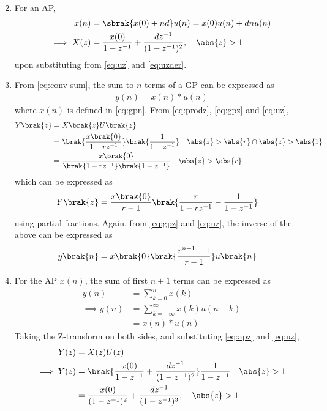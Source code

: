 \begin{enumerate}[label=\thesubsection.\arabic*,ref=\thesubsection.\theenumi]
\begin{align}
	       \label{eq:uzder}
\end{align}
\item For an AP, 
\begin{align}
	x(n) &= \sbrak{x(0) + nd} u(n) = x(0)u(n) + dnu(n)  \\
	\implies X(z) &= \frac{x(0)}{1-z^{-1}} + \frac{dz^{-1}}{(1-z^{-1})^{2}}, \quad \abs{z} > 1 
	       \label{eq:apz}
\end{align}
upon substituting from 
	       \eqref{eq:uz}
	       and
	       \eqref{eq:uzder}.
\item From 
	\eqref{eq:conv-sum},  the sum to $n$ terms  of a GP can be expressed as
\begin{align}
	y(n) = x(n)*u(n) 
\end{align}
		where $x(n)$ is defined in 
	       \eqref{eq:gpn}.
From \eqref{eq:prodz}, \eqref{eq:gpz} and \eqref{eq:uz},
\begin{align}
	Y\brak{z}&= X\brak{z} U\brak{z}
	\\
	&=\brak{\frac{x\brak{0}}{1-rz^{-1}}}\brak{\frac{1}{1-z^{-1}}} \quad \abs{z} > \abs{r} \cap \abs{z}>\abs{1}
	\\
	&=\frac{x\brak{0}}{\brak{1-rz^{-1}}\brak{1-z^{-1}}} \quad \abs{z} > \abs{r} 
\end{align}
which can be expressed as
\begin{align}
	Y\brak{z}&=\frac{x\brak{0}}{r-1}\brak{\frac{r}{1-rz^{-1}} - \frac{1}{1-z^{-1}}}
\end{align}
using partial fractions.  Again, from \eqref{eq:gpz} and \eqref{eq:uz}, the inverse of the above can be expressed as
\begin{align}
	y\brak{n}
	&=x\brak{0}\brak{\frac{r^{n+1}-1}{r-1}}u\brak{n}
\end{align}
\item For the AP $x(n)$, the sum of first $n+1$ terms can be expressed as
\begin{align}
y(n) &= \sum_{k=0}^{n} x(k)\\
\implies y(n) &= \sum_{k=-\infty}^{\infty} x(k) u(n-k)\\
&= x(n) * u(n)
\end{align}
Taking the Z-transform on both sides, and substituting \eqref{eq:apz} and \eqref{eq:uz},
\begin{align}
Y(z) &= X(z) U(z)\\
\implies Y(z) &= \brak{\frac{x(0)}{1-z^{-1}} + \frac{dz^{-1}}{(1-z^{-1})^{2}}}\frac{1}{1-z^{-1}} \quad \abs{z} > 1 \\
&= \frac{x(0)}{({1-z^{-1}})^2} + \frac{dz^{-1}}{(1-z^{-1})^{3}}, \quad \abs{z} > 1 \label{eq:APSum}

\end{align}
\end{enumerate}
